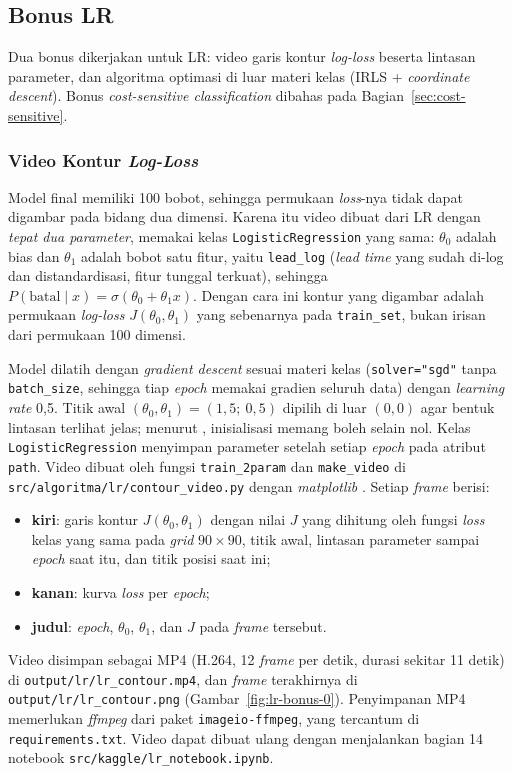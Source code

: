 \subsection{Bonus LR}
\label{subsec:lr-bonus}

Dua bonus dikerjakan untuk LR: video garis kontur \textit{log-loss} beserta lintasan parameter, dan algoritma optimasi di luar materi kelas (IRLS + \textit{coordinate descent}). Bonus \textit{cost-sensitive classification} dibahas pada Bagian~\ref{sec:cost-sensitive}.

\subsubsection{Video Kontur \textit{Log-Loss}}
\label{subsubsec:lr-video}
Model final memiliki 100 bobot, sehingga permukaan \textit{loss}-nya tidak dapat digambar pada bidang dua dimensi. Karena itu video dibuat dari LR dengan \textit{tepat dua parameter}, memakai kelas \texttt{LogisticRegression} yang sama: $\theta_0$ adalah bias dan $\theta_1$ adalah bobot satu fitur, yaitu \texttt{lead\_log} (\textit{lead time} yang sudah di-log dan distandardisasi, fitur tunggal terkuat), sehingga $P(\text{batal}\mid x) = \sigma(\theta_0 + \theta_1 x)$. Dengan cara ini kontur yang digambar adalah permukaan \textit{log-loss} $J(\theta_0, \theta_1)$ yang sebenarnya pada \texttt{train\_set}, bukan irisan dari permukaan 100 dimensi.

Model dilatih dengan \textit{gradient descent} sesuai materi kelas \cite{khodra-lr-sga} (\texttt{solver="sgd"} tanpa \texttt{batch\_size}, sehingga tiap \textit{epoch} memakai gradien seluruh data) dengan \textit{learning rate} 0,5. Titik awal $(\theta_0, \theta_1) = (1{,}5;\ 0{,}5)$ dipilih di luar $(0, 0)$ agar bentuk lintasan terlihat jelas; menurut \cite{khodra-lr-sga}, inisialisasi memang boleh selain nol. Kelas \texttt{LogisticRegression} menyimpan parameter setelah setiap \textit{epoch} pada atribut \texttt{path}. Video dibuat oleh fungsi \texttt{train\_2param} dan \texttt{make\_video} di \nolinkurl{src/algoritma/lr/contour_video.py} dengan \textit{matplotlib} \cite{hunter2007matplotlib}. Setiap \textit{frame} berisi:
\begin{itemize}
	\item \textbf{kiri}: garis kontur $J(\theta_0, \theta_1)$ dengan nilai $J$ yang dihitung oleh fungsi \textit{loss} kelas yang sama pada \textit{grid} $90 \times 90$, titik awal, lintasan parameter sampai \textit{epoch} saat itu, dan titik posisi saat ini;
	\item \textbf{kanan}: kurva \textit{loss} per \textit{epoch};
	\item \textbf{judul}: \textit{epoch}, $\theta_0$, $\theta_1$, dan $J$ pada \textit{frame} tersebut.
\end{itemize}
Video disimpan sebagai MP4 (H.264, 12 \textit{frame} per detik, durasi sekitar 11 detik) di \nolinkurl{output/lr/lr_contour.mp4}, dan \textit{frame} terakhirnya di \nolinkurl{output/lr/lr_contour.png} (Gambar~\ref{fig:lr-bonus-0}). Penyimpanan MP4 memerlukan \textit{ffmpeg} dari paket \texttt{imageio-\allowbreak ffmpeg}, yang tercantum di \texttt{requirements.txt}. Video dapat dibuat ulang dengan menjalankan bagian 14 notebook \nolinkurl{src/kaggle/lr_notebook.ipynb}.

